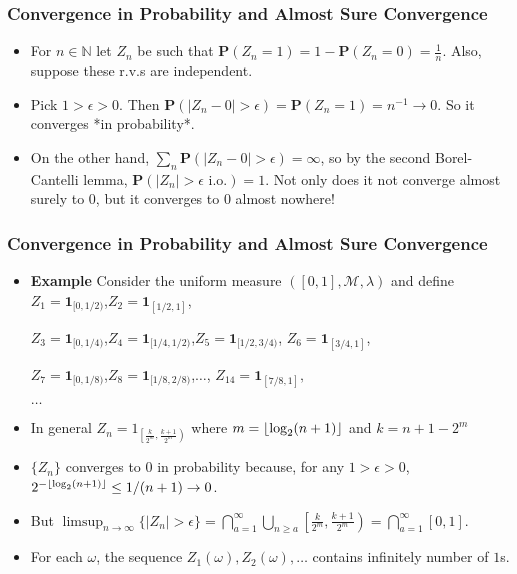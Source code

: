 \documentclass[handout]{beamer}
\DeclarePairedDelimiter\floor{\lfloor}{\rfloor}
\newcommand{\BP}{\mathbf{P}}
\newcommand{\BI}{\mathbf{1}}
\begin{document}
\frame
{
  \frametitle{Convergence in Probability and Almost Sure Convergence}

   \begin{itemize}
     
\item<2-> For $n \in \mathbb{N}$ let $Z_n$ be such that $\BP(Z_n = 1) = 1 - \BP(Z_n = 0) = \frac{1}{n}.$ Also, suppose these r.v.s are independent. 
   
\item<3-> Pick $1 > \epsilon > 0$. Then $\BP(|Z_n - 0| > \epsilon) = \BP(Z_n = 1) = n^{-1} \to 0$. So it converges *in probability*.

\item<3-> On the other hand, $\sum_n \BP(|Z_n - 0| > \epsilon) = \infty$, so by the second Borel-Cantelli lemma, $\BP(|Z_n| > \epsilon \text{ i.o.} ) = 1$. Not only does it not converge almost surely to $0$, but it converges to $0$ almost nowhere!
                                      
\end{itemize}
}

\frame
{
  \frametitle{Convergence in Probability and Almost Sure Convergence}

   \begin{itemize}
     
   \item<2-> \textbf{Example} Consider the uniform measure $([0,1],\mathcal{M}, \lambda)$ and define 
      $Z_1=\BI_{[0,1/2)}$,$Z_2=\BI_{[1/2,1]}$, 
      
      $Z_3=\BI_{[0,1/4)}$,$Z_4=\BI_{[1/4,1/2)}$,$Z_5=\BI_{[1/2,3/4)}$, $Z_6=\BI_{[3/4,1]}$,
      
      $Z_7=\BI_{[0,1/8)}$,$Z_8=\BI_{[1/8,2/8)}$,$\ldots$, $Z_{14}=\BI_{[7/8,1]},$
      
      $\ldots $
      
    \item<3->[-] In general $Z_n = 1_{\left[\frac{k}{2^m}, \frac{k+1}{2^m} \right)}$ where $m = \floor{\log_2(n + 1)}$ and $k = n + 1 - 2^m$
      
    \item<3->[-] $\{Z_n\}$ converges to $0$ in probability because, for any $1 > \epsilon > 0$, $2^{- \floor{\log_2(n + 1)}} \le 1/(n+1) \to 0$. 
    
    \item<4->[-] But $\limsup_{n \to \infty} \{|Z_n| > \epsilon\} = \bigcap_{a=1}^ \infty \bigcup_{n \ge a} \left[\frac{k}{2^m}, \frac{k+1}{2^m} \right) = \bigcap_{a=1}^ \infty [0,1]$.
    
    
    
    \item<5->[-] For each $\omega$, the sequence $Z_1(\omega), Z_2(\omega),\ldots$ contains infinitely number of $1$s. 
      
      
          
                                      
\end{itemize}
}
\end{document}
